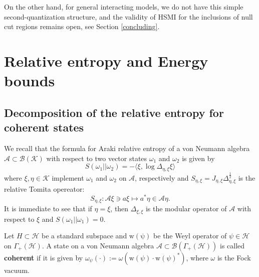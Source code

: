 \documentclass[12pt]{article}
\def\A{{\mathcal A}}
\def\B{{\mathcal B}}
\def\H{{\mathcal H}}
\def\K{{\mathcal K}}
\theoremstyle{remark}
\begin{document}
On the other hand, for general interacting models, we do not have this simple second-quantization structure,
and the validity of HSMI for the inclusions of null cut regions remains open, see Section \ref{concluding}.


\section{Relative entropy and Energy bounds}\label{entropy}

\subsection{Decomposition of the relative entropy for coherent states}\label{section-Entropy-NEC}

We recall that the formula for Araki relative entropy of a von Neumann algebra $\A\subset\mathcal B(\K)$ with respect to two vector states $\omega_1$ and $\omega_2$ is given by
$$S(\omega_1||\omega_2)=-\langle\xi,\log\Delta_{\eta,\xi} \xi\rangle$$
where $\xi,\eta\in\K$ implement $\omega_1$ and $\omega_2$ on $\A$, respectively and $S_{\eta,\xi} = J_{\eta,\xi}\Delta_{\eta,\xi}^\frac12$ is the relative Tomita opereator:
$$S_{\eta,\xi}:\A\xi\ni a\xi\mapsto a^*\eta\in\A\eta.$$
It is immediate to see that if $\eta=\xi$, then $\Delta_{\xi,\xi}$ is the modular operator of $\A$ with respect to $\xi$ and $S(\omega_1||\omega_1)=0$.

Let $H \subset \H$ be a standard subspace and $\mathrm{w(\psi)}$ be the Weyl operator of $\psi\in\H$ on $\Gamma_+(\H)$.
A state on a von Neumann algebra $\A \subset \B(\Gamma_+(\H))$ is called \textbf{coherent}
if it is given by $\omega_\psi(\cdot):=\omega(\mathrm w(\psi)\cdot \mathrm w(\psi)^*)$,
where $\omega$ is the Fock vacuum.
\end{document}
